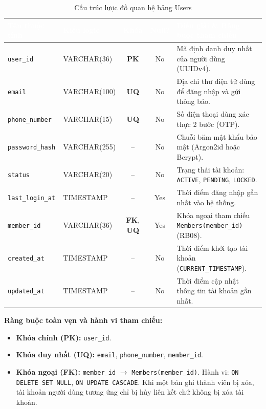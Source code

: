 \begin{table}[H]
    \centering
    \small
    \renewcommand{\arraystretch}{1.2}
    \begin{tabularx}{\textwidth}{p{3.0cm} p{2.6cm} c c X}
        \toprule
        \rowcolor{tableheader}\textcolor{white}{\textbf{Tên thuộc tính}} & \textcolor{white}{\textbf{Kiểu logic}} & \textcolor{white}{\textbf{Khóa}} & \textcolor{white}{\textbf{Null?}} & \textcolor{white}{\textbf{Diễn giải \& Ràng buộc tham chiếu}} \\
        \midrule
        \rowcolor{tablerowalt}
        \texttt{user\_id} & VARCHAR(36) & \textcolor{pkcolor}{\textbf{PK}} & No & Mã định danh duy nhất của người dùng (UUIDv4). \\
        \texttt{email} & VARCHAR(100) & \textbf{UQ} & No & Địa chỉ thư điện tử dùng để đăng nhập và gửi thông báo. \\
        \rowcolor{tablerowalt}
        \texttt{phone\_number} & VARCHAR(15) & \textbf{UQ} & No & Số điện thoại dùng xác thực 2 bước (OTP). \\
        \texttt{password\_hash} & VARCHAR(255) & -- & No & Chuỗi băm mật khẩu bảo mật (Argon2id hoặc Bcrypt). \\
        \rowcolor{tablerowalt}
        \texttt{status} & VARCHAR(20) & -- & No & Trạng thái tài khoản: \texttt{ACTIVE}, \texttt{PENDING}, \texttt{LOCKED}. \\
        \texttt{last\_login\_at} & TIMESTAMP & -- & Yes & Thời điểm đăng nhập gần nhất vào hệ thống. \\
        \rowcolor{tablerowalt}
        \texttt{member\_id} & VARCHAR(36) & \textcolor{fkcolor}{\textbf{FK}}, \textbf{UQ} & Yes & Khóa ngoại tham chiếu \texttt{Members(member\_id)} (RB08). \\
        \texttt{created\_at} & TIMESTAMP & -- & No & Thời điểm khởi tạo tài khoản (\texttt{CURRENT\_TIMESTAMP}). \\
        \rowcolor{tablerowalt}
        \texttt{updated\_at} & TIMESTAMP & -- & No & Thời điểm cập nhật thông tin tài khoản gần nhất. \\
        \bottomrule
    \end{tabularx}
    \caption{Cấu trúc lược đồ quan hệ bảng Users}
    \label{tab:schema_users}
\end{table}

\noindent\textbf{Ràng buộc toàn vẹn và hành vi tham chiếu:}
\begin{itemize}[noitemsep,topsep=2pt]
    \item \textbf{Khóa chính (PK):} \texttt{user\_id}.
    \item \textbf{Khóa duy nhất (UQ):} \texttt{email}, \texttt{phone\_number}, \texttt{member\_id}.
    \item \textbf{Khóa ngoại (FK):} \texttt{member\_id} $\rightarrow$ \texttt{Members(member\_id)}. Hành vi: \texttt{ON DELETE SET NULL}, \texttt{ON UPDATE CASCADE}. Khi một bản ghi thành viên bị xóa, tài khoản người dùng tương ứng chỉ bị hủy liên kết chứ không bị xóa tài khoản.
\end{itemize}


